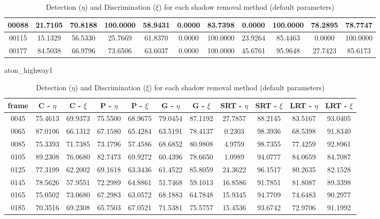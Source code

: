 \begin{appendices}
\begin{table}
\begin{tabular}{ |c|c|c|c|c|c|c|c|c|c|c| }
\hline
00088 &  21.7105 &  70.8188 &   100.0000 &  58.9431 &   0.0000 &  83.7398 &   0.0000 &  100.0000 &   78.2895 &  78.7747 \\
\hline
00115 &  15.1329 &  56.5330 &   25.7669 &  61.8370 &   0.0000 &  100.0000 &   23.9264 &  85.4463 &   0.0000 &  100.0000 \\
\hline
00177 &  84.5038 &  66.9796 &   73.6506 &  63.6037 &   0.0000 &  100.0000 &   45.6761 &  95.9648 &   27.7423 &  85.6173 \\
\hline
\end{tabular}
\caption*{Detection ($\eta$) and Discrimination ($\xi$) for each shadow removal method (default parameters)}
\end{table}

\begin{table}
\centering
\caption{aton\_highway1}
\begin{tabular}{ |c|c|c|c|c|c|c|c|c|c|c| }
	\hline
\textbf{frame} &  \textbf{C - $\eta$} &  \textbf{C - $\xi$} &  \textbf{P - $\eta$} &  \textbf{P - $\xi$} &  \textbf{G - $\eta$} &  \textbf{G - $\xi$} &  \textbf{SRT - $\eta$} &  \textbf{SRT - $\xi$} &  \textbf{LRT - $\eta$} &  \textbf{LRT - $\xi$} \\
\hline
\hline
0045 &  75.4613 &  69.9373 &   75.5500 &  68.9675 &   79.0454 &  87.1192 &   27.7857 &  88.2145 &   83.5167 &  93.0405    \\
\hline
0065 &  87.0106 &  66.1312 &   67.1580 &  65.4284 &   63.5191 &  78.4137 &   0.2303 &  98.3936 &   68.5398 &  91.8340    \\
\hline
0085 &  75.3393 &  71.7385 &   73.1796 &  57.4586 &   68.6852 &  80.9808 &   4.9759 &  98.7355 &   77.4259 &  92.8961    \\
\hline
0105 &  89.2308 &  76.0680 &   82.7473 &  69.9272 &   60.4396 &  78.6650 &   1.0989 &  94.0777 &   84.0659 &  84.7087    \\
\hline
0125 &  77.3199 &  62.2002 &   69.1618 &  63.3436 &   61.4522 &  85.8059 &   24.3622 &  96.1517 &   80.2635 &  82.1528    \\
\hline
0145 &  78.5626 &  57.9551 &   72.2989 &  64.8861 &   51.7468 &  59.1013 &   16.8586 &  91.7851 &   81.8087 &  89.3398    \\
\hline
0165 &  75.0502 &  73.0680 &   67.2983 &  63.0572 &   68.1883 &  64.7848 &   15.9345 &  94.7709 &   74.6483 &  90.2977    \\
\hline
0185 &  70.3516 &  69.2308 &   65.7503 &  67.0521 &   71.5381 &  75.5757 &   15.4536 &  93.6742 &   72.9706 &  91.1992    \\
\hline
\end{tabular}
\caption*{Detection ($\eta$) and Discrimination ($\xi$) for each shadow removal method (default parameters)}
\end{table}


\end{appendices}
